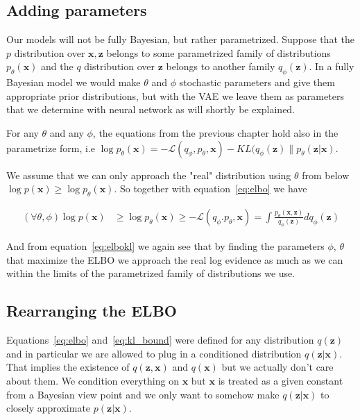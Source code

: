 \documentclass[11pt, a4paper]{report}
\theoremstyle{plain}
\theoremstyle{definition}
\theoremstyle{remark}
\newcommand{\x}{\mathbf{x}}
\newcommand{\z}{\mathbf{z}}
\begin{document}
\subsection{Adding parameters}

Our models will not be fully Bayesian, but rather parametrized.
Suppose that the $p$ distribution over $\x,\z$ belongs to some parametrized family of
distributions $p_{\theta}(\x)$ and the $q$ distribution over $\z$ belongs to another
family $q_{\phi}(\z)$. In a fully Bayesian model we would make $\theta$ and
$\phi$ stochastic parameters and give them appropriate prior distributions, but
with the VAE we leave them as parameters that we determine with neural network
as will shortly be explained.

For any $\theta$ and any $\phi$, the equations from the previous chapter hold
also in the parametrize form, i.e 
$\log p_{\theta}(\x) =
-\mathcal{L}(q_{\phi},p_{\theta},\x) -
KL(q_{\phi}(\z) \| p_{\theta}(\z|\x)$.

We assume that we can only approach the "real" distribution using
$\theta$ from below $\log p(\x) \geq \log p_{\theta}(\x)$.
So together with equation~\ref{eq:elbo} we have

\begin{equation}\label{eq:parelbo}
\begin{aligned}
(\forall \theta, \phi)\log p(\x) & \geq \log p_{\theta}(\x) 
\geq -\mathcal{L}(q_{\phi}.p_{\theta},\x)
= \int \frac{p_{\theta}(\x,\z)}{q_{\phi}(\z)} dq_{\phi}(\z)
\end{aligned}
\end{equation}

And from equation~\ref{eq:elbokl} we again see that by finding the parameters
$\phi$, $\theta$ that maximize the ELBO we approach the real log evidence as much
as we can within the limits of the parametrized family of distributions we use.

\subsection{Rearranging the ELBO}
Equations~\ref{eq:elbo} and~\ref{eq:kl_bound} were defined for any distribution
$q(\z)$ and in particular we are allowed to plug in a conditioned
distribution $q(\z|\x)$. That implies the existence of $q(\z,\x)$ and $q(\x)$
but we actually don't care about them. We condition everything on $\x$ but $\x$
is treated as a given constant from a Bayesian view point and we only want to
somehow make $q(\z|\x)$ to closely approximate $p(\z | \x)$.
\end{document}
